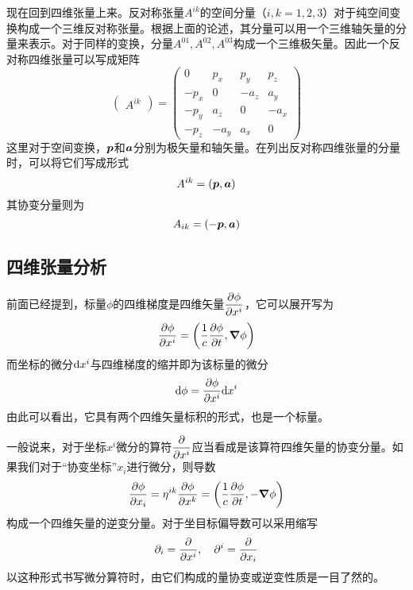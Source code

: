 现在回到四维张量上来。反对称张量$A^{ik}$的空间分量（$i,k=1,2,3$）对于纯空间变换构成一个三维反对称张量。根据上面的论述，其分量可以用一个三维轴矢量的分量来表示。对于同样的变换，分量$A^{01},A^{02},A^{03}$构成一个三维极矢量。因此一个反对称四维张量可以写成矩阵
\begin{equation}
	\begin{pmatrix} A^{ik} \end{pmatrix} = \begin{pmatrix} 0 & p_x & p_y & p_z \\ -p_x & 0 & -a_z & a_y \\ -p_y & a_z & 0 & -a_x \\ -p_z & -a_y & a_x & 0 \end{pmatrix}
\end{equation}
这里对于空间变换，$\boldsymbol{p}$和$\boldsymbol{a}$分别为极矢量和轴矢量。在列出反对称四维张量的分量时，可以将它们写成形式
\begin{equation*}
	A^{ik} = (\boldsymbol{p},\boldsymbol{a})
\end{equation*}
其协变分量则为
\begin{equation*}
	A_{ik} = (-\boldsymbol{p},\boldsymbol{a})
\end{equation*}

\subsection{四维张量分析}

前面已经提到，标量$\phi$的四维梯度是四维矢量$\dfrac{\partial \phi}{\partial x^i}$，它可以展开写为
\begin{equation}
	\frac{\partial \phi}{\partial x^i} = \left(\frac{1}{c}\frac{\partial \phi}{\partial t},\boldsymbol{\nabla} \phi\right)
\end{equation}
而坐标的微分$\mathrm{d} x^i$与四维梯度的缩并即为该标量的微分
\begin{equation*}
	\mathrm{d}\phi = \frac{\partial \phi}{\partial x^i} \mathrm{d}x^i
\end{equation*}
由此可以看出，它具有两个四维矢量标积的形式，也是一个标量。

一般说来，对于坐标$x^i$微分的算符$\dfrac{\partial}{\partial x^i}$应当看成是该算符四维矢量的协变分量。如果我们对于“协变坐标”$x_i$进行微分，则导数
\begin{equation*}
	\frac{\partial \phi}{\partial x_i} = \eta^{ik} \frac{\partial \phi}{\partial x^k} = \left(\frac{1}{c}\frac{\partial \phi}{\partial t},-\boldsymbol{\nabla} \phi\right)
\end{equation*}
构成一个四维矢量的逆变分量。对于坐目标偏导数可以采用缩写
\begin{equation*}
	\partial_i = \frac{\partial}{\partial x^i},\quad \partial^i = \frac{\partial}{\partial x_i}
\end{equation*}
以这种形式书写微分算符时，由它们构成的量协变或逆变性质是一目了然的。

